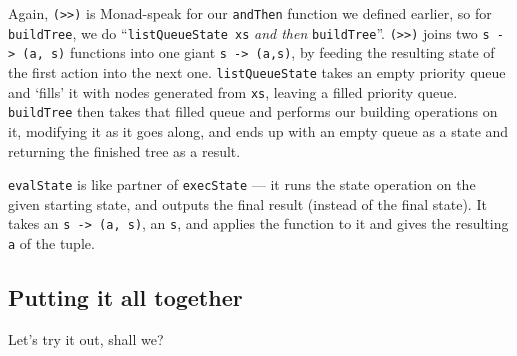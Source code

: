 \documentclass[]{article}
\newenvironment{Shaded}{}{}
\newcommand{\DataTypeTok}[1]{\textcolor[rgb]{0.56,0.13,0.00}{{#1}}}
\newcommand{\CharTok}[1]{\textcolor[rgb]{0.25,0.44,0.63}{{#1}}}
\newcommand{\StringTok}[1]{\textcolor[rgb]{0.25,0.44,0.63}{{#1}}}
\newcommand{\FunctionTok}[1]{\textcolor[rgb]{0.02,0.16,0.49}{{#1}}}
\newcommand{\NormalTok}[1]{{#1}}
\begin{document}
Again, \texttt{(\textgreater{}\textgreater{})} is Monad-speak for our
\texttt{andThen} function we defined earlier, so for \texttt{buildTree},
we do ``\texttt{listQueueState\ xs} \emph{and then}
\texttt{buildTree}''. \texttt{(\textgreater{}\textgreater{})} joins two
\texttt{s\ -\textgreater{}\ (a,\ s)} functions into one giant
\texttt{s\ -\textgreater{}\ (a,s)}, by feeding the resulting state of
the first action into the next one. \texttt{listQueueState} takes an
empty priority queue and `fills' it with nodes generated from
\texttt{xs}, leaving a filled priority queue. \texttt{buildTree} then
takes that filled queue and performs our building operations on it,
modifying it as it goes along, and ends up with an empty queue as a
state and returning the finished tree as a result.

\texttt{evalState} is like partner of \texttt{execState} --- it runs the
state operation on the given starting state, and outputs the final
result (instead of the final state). It takes an
\texttt{s\ -\textgreater{}\ (a,\ s)}, an \texttt{s}, and applies the
function to it and gives the resulting \texttt{a} of the tuple.

\subsection{Putting it all together}\label{putting-it-all-together}

Let's try it out, shall we?

\begin{Shaded}
\end{Shaded}
\end{document}
